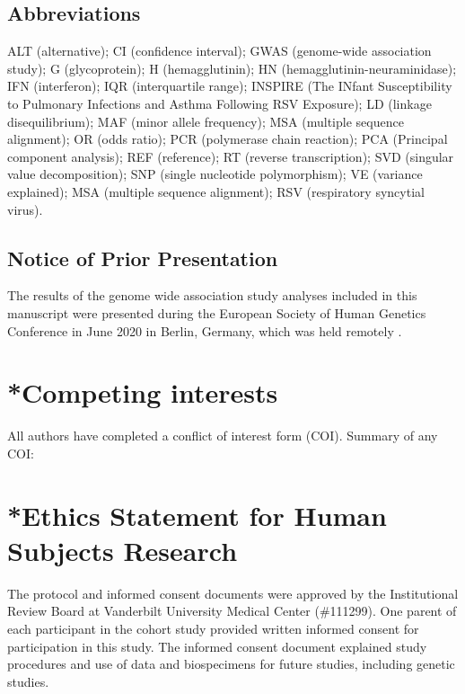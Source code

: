 \documentclass{article} %
\makeatletter
\renewcommand{\maketitle}{\bgroup\setlength{\parindent}{0pt}
\begin{flushleft}
  \textbf{\@title}

  \@author
\end{flushleft}\egroup
}
\makeatother
\begin{document}
\maketitle


\subsection*{Abbreviations}
ALT (alternative);
CI (confidence interval);
GWAS (genome-wide association study);
G (glycoprotein);
H (hemagglutinin);
HN (hemagglutinin-neuraminidase);
IFN (interferon);
IQR (interquartile range);
INSPIRE (The INfant Susceptibility to Pulmonary Infections and Asthma Following RSV Exposure);
LD (linkage disequilibrium);
MAF (minor allele frequency);
MSA (multiple sequence alignment);
OR (odds ratio);
PCR (polymerase chain reaction);
PCA (Principal component analysis);
REF (reference);
RT (reverse transcription);
SVD (singular value decomposition);
SNP (single nucleotide polymorphism);
VE (variance explained);
MSA (multiple sequence alignment);
RSV (respiratory syncytial virus).

\subsection*{Notice of Prior Presentation}
The results of the genome wide association study analyses included in this manuscript were presented during the European Society of Human Genetics Conference in June 2020 in Berlin, Germany, which was held remotely 
\citep{lawless2020genome}.

\section*{*Competing interests}
All authors have completed a conflict of interest form (COI). Summary of any COI:

\section*{*Ethics Statement for Human Subjects Research}
The protocol and informed consent documents were approved by the Institutional Review Board at Vanderbilt University Medical Center (\#111299).  
One parent of each participant in the cohort study provided written informed consent for participation in this study. 
The informed consent document explained study procedures and use of data and biospecimens for future studies, including genetic studies.
\end{document}
